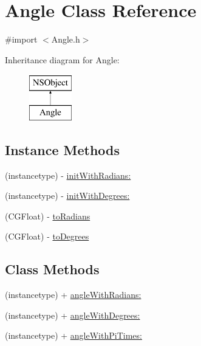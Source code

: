 \hypertarget{interface_angle}{}\section{Angle Class Reference}
\label{interface_angle}


{\ttfamily \#import $<$Angle.\+h$>$}

Inheritance diagram for Angle\+:\begin{figure}[H]
\begin{center}
\leavevmode
\includegraphics[height=2.000000cm]{interface_angle}
\end{center}
\end{figure}
\subsection*{Instance Methods}
\begin{DoxyCompactItemize}
\item 
(instancetype) -\/ \hyperlink{interface_angle_ac050ce73d4589a1da91c4688128f0c40}{init\+With\+Radians\+:}
\item 
(instancetype) -\/ \hyperlink{interface_angle_a51b864fa98940a6bf4c1cef38c2c6319}{init\+With\+Degrees\+:}
\item 
(C\+G\+Float) -\/ \hyperlink{interface_angle_a246b23cca6e3c22538260089bcf4830a}{to\+Radians}
\item 
(C\+G\+Float) -\/ \hyperlink{interface_angle_a70ff5c8dfd1bccc2e95d4029621a5e20}{to\+Degrees}
\end{DoxyCompactItemize}
\subsection*{Class Methods}
\begin{DoxyCompactItemize}
\item 
(instancetype) + \hyperlink{interface_angle_ae663521031e6c338e0446ecbfc3b0ce3}{angle\+With\+Radians\+:}
\item 
(instancetype) + \hyperlink{interface_angle_ac1c2353d65d8e2621aa2463aa7e0620a}{angle\+With\+Degrees\+:}
\item 
(instancetype) + \hyperlink{interface_angle_aa22d8b75daa0c7b6eca79a5266d49eff}{angle\+With\+Pi\+Times\+:}
\end{DoxyCompactItemize}


